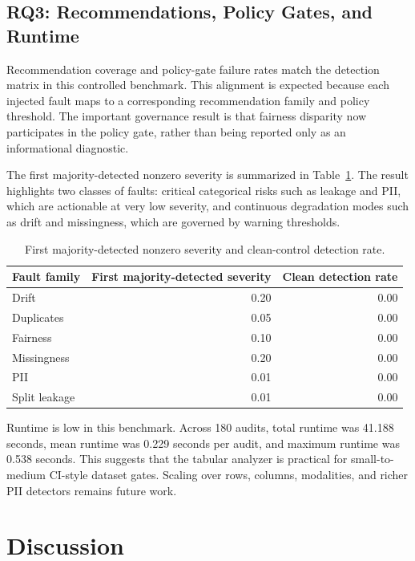 \documentclass[runningheads]{llncs}
\begin{document}
\subsection{RQ3: Recommendations, Policy Gates, and Runtime}

Recommendation coverage and policy-gate failure rates match the detection matrix
in this controlled benchmark. This alignment is expected because each injected
fault maps to a corresponding recommendation family and policy threshold. The
important governance result is that fairness disparity now participates in the
policy gate, rather than being reported only as an informational diagnostic.

The first majority-detected nonzero severity is summarized in
Table~\ref{tab:first-detected}. The result highlights two classes of faults:
critical categorical risks such as leakage and PII, which are actionable at very
low severity, and continuous degradation modes such as drift and missingness,
which are governed by warning thresholds.

\begin{table}
\centering
\caption{First majority-detected nonzero severity and clean-control detection rate.}
\label{tab:first-detected}
\begin{tabular}{lrr}
\toprule
Fault family & First majority-detected severity & Clean detection rate \\
\midrule
Drift & 0.20 & 0.00 \\
Duplicates & 0.05 & 0.00 \\
Fairness & 0.10 & 0.00 \\
Missingness & 0.20 & 0.00 \\
PII & 0.01 & 0.00 \\
Split leakage & 0.01 & 0.00 \\
\bottomrule
\end{tabular}
\end{table}

Runtime is low in this benchmark. Across 180 audits, total runtime was 41.188
seconds, mean runtime was 0.229 seconds per audit, and maximum runtime was 0.538
seconds. This suggests that the tabular analyzer is practical for small-to-medium
CI-style dataset gates. Scaling over rows, columns, modalities, and richer PII
detectors remains future work.

\section{Discussion}
\end{document}
